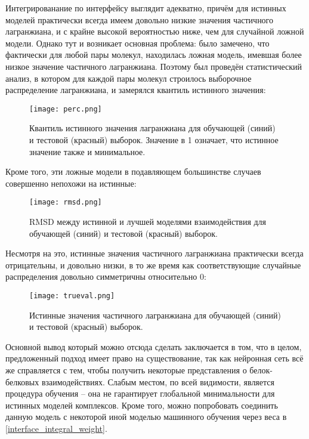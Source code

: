 Интегрированание по интерфейсу выглядит адекватно, причём для истинных моделей практически всегда имеем довольно низкие значения частичного лагранжиана, и с крайне высокой вероятностью ниже, чем для случайной ложной модели. Однако тут и возникает основная проблема: было замечено, что фактически для любой пары молекул, находилась ложная модель, имевшая более низкое значение частичного лагранжиана. Поэтому был проведён статистический анализ, в котором для каждой пары молекул строилось выборочное распределение лагранжиана, и замерялся квантиль истинного значения:
\begin{figure}[H]
	\centering
	\texttt{[image: perc.png]}
	\caption{Квантиль истинного значения лагранжиана для обучающей (синий) и тестовой (красный) выборок. Значение в 1 означает, что истинное значение также и минимальное.}
	\label{fig_perc}
\end{figure}
Кроме того, эти ложные модели в подавляющем большинстве случаев совершенно непохожи на истинные:
\begin{figure}[H]
	\centering
	\texttt{[image: rmsd.png]}
	\caption{RMSD между истинной и лучшей моделями взаимодействия для обучающей (синий) и тестовой (красный) выборок.}
	\label{fig_rmsd}
\end{figure}
Несмотря на это, истинные значения частичного лагранжиана практически всегда отрицательны, и довольно низки, в то же время как соответствующие случайные распределения довольно симметричны относительно 0:
\begin{figure}[H]
	\centering
	\texttt{[image: trueval.png]}
	\caption{Истинные значения частичного лагранжиана для обучающей (синий) и тестовой (красный) выборок.}
	\label{fig_trueval}
\end{figure}

Основной вывод который можно отсюда сделать заключается в том, что в целом, предложенный подход имеет право на существование, так как нейронная сеть всё же справляется с тем, чтобы получить некоторые представления о белок-белковых взаимодействиях. Слабым местом, по всей видимости, является процедура обучения -- она не гарантирует глобальной минимальности для истинных моделей комплексов. Кроме того, можно попробовать соединить данную модель с некоторой иной моделью машинного обучения через веса в \ref{interface_integral_weight}.